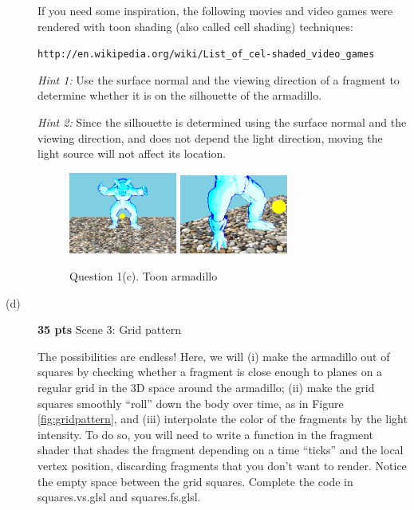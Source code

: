 \documentclass[12pt]{exam}
\begin{document}
\begin{description}
\vspace{0.2cm}

If you need some inspiration, the following movies and video games were rendered with toon shading (also called cell shading) techniques:

{\tt http://en.wikipedia.org/wiki/List\_of\_cel-shaded\_video\_games}

\textit{Hint 1: } Use the surface normal and the viewing direction of a fragment to determine whether it is on the silhouette of the armadillo.

\textit{Hint 2: } Since the silhouette is determined using the surface normal and the
viewing direction, and does not depend the light direction, moving the light source
will not affect its location.

    \begin{figure}[H]
    \centering
    \includegraphics[width=0.35\textwidth]{./q3i.png}
    \includegraphics[width=0.35\textwidth]{./q3ii.png}
    \caption{Question 1(c). Toon armadillo}
    \end{figure}

\clearpage

\item[(d)] {\bf 35 pts} Scene 3: Grid pattern

  The possibilities are endless! Here, we will (i) make the armadillo
  out of squares by checking whether a fragment is close enough to planes
  on a regular grid in the 3D space around the armadillo; (ii) make
  the grid squares smoothly ``roll'' down the body over time, as in
  Figure \ref{fig:gridpattern}, and (iii) interpolate the color of the fragments
  by the light intensity. To do so, you will need to write a function in the fragment
  shader that shades the fragment depending on a time ``ticks'' and
  the local vertex position, discarding fragments that you don't want
  to render. Notice the empty space between the grid squares. Complete the
  code in squares.vs.glsl and squares.fs.glsl.


\end{description}
\end{document}
